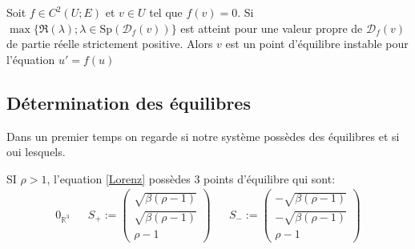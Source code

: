 \documentclass{article}
\newcommand*\colv[1]{
\left(\begin{array}{c}
    #1
\end{array}\right)
}
\newcommand{\R}{\mathbb{R}}
\newtheorem[M , nocut]{prop}{Proposition}[section]
\newtheorem[M]{propt}{Propriété}[section]
\newtheorem[L , nocut]{thm}{Théoreme}
\newtheorem[L]{cor}{Corollaire}
\begin{document}

\begin{thm}
    \label{thm:eq-instable}
    Soit $f\in C^2(U;E)$ et $v\in U$ tel que $f(v)=0$. Si $\max\{\Re(\lambda); \lambda\in \mathrm{Sp}(\mathcal{D}_f(v))\}$ est atteint pour une valeur propre de $\mathcal{D}_f(v)$ de partie réelle strictement positive. Alors $v$ est un point d'équilibre instable pour l'équation $u'=f(u)$
\end{thm}


\subsection{Détermination des équilibres}
Dans un premier temps on regarde si notre système possèdes des équilibres et si oui lesquels.
\begin{prop}
    SI $\rho>1$, l'equation \eqref{Lorenz} possèdes 3 points d'équilibre qui sont:
    \begin{align*}
        0_{\R^3} &&   S_+ :=\colv{\sqrt{ \beta (\rho -1)} \\ \sqrt{\beta (\rho -1)}\\ \rho -1}  &&  S_- := \colv{-\sqrt{ \beta (\rho -1)} \\ - \sqrt{\beta (\rho -1)}\\ \rho -1}
    \end{align*}
\end{prop}
\end{document}
